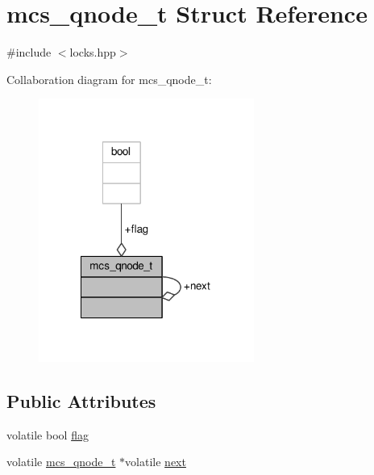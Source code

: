 \hypertarget{structmcs__qnode__t}{\section{mcs\-\_\-qnode\-\_\-t Struct Reference}
\label{structmcs__qnode__t}
}


{\ttfamily \#include $<$locks.\-hpp$>$}



Collaboration diagram for mcs\-\_\-qnode\-\_\-t\-:
\nopagebreak
\begin{figure}[H]
\begin{center}
\leavevmode
\includegraphics[width=200pt]{structmcs__qnode__t__coll__graph}
\end{center}
\end{figure}
\subsection*{Public Attributes}
\begin{DoxyCompactItemize}
\item 
volatile bool \hyperlink{structmcs__qnode__t_a0ac75e4cc45a4d99604ec871e50cab99}{flag}
\item 
volatile \hyperlink{structmcs__qnode__t}{mcs\-\_\-qnode\-\_\-t} $\ast$volatile \hyperlink{structmcs__qnode__t_ace1d0e066941d057de4bad5a38fed841}{next}
\end{DoxyCompactItemize}


